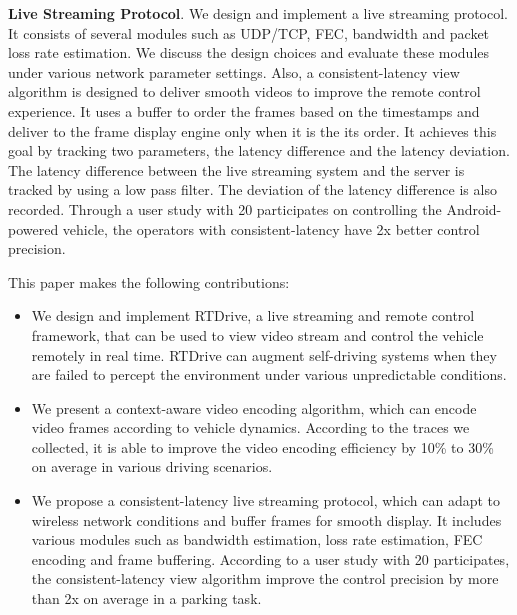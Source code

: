 \textbf{Live Streaming Protocol}.
We design and implement a live streaming protocol. 
It consists of several modules such as UDP/TCP, FEC, 
bandwidth and packet loss rate estimation. 
We discuss the design choices and evaluate these modules
under various network parameter settings. 
Also, a consistent-latency view algorithm 
is designed to deliver smooth
videos to improve the remote control experience. 
It uses a buffer to order the frames based on the timestamps
and deliver to the frame display engine only when it is 
the its order.
It achieves this goal by tracking two parameters, 
the latency difference and the latency deviation.   
The latency difference between
the live streaming system and the server is
tracked by using a low pass filter. 
The deviation of the latency difference is also recorded. 
Through a user study with 20 participates on controlling the Android-powered
vehicle, the operators with consistent-latency have
2x better control precision. 


This paper makes the following contributions:
\begin{itemize}
\setlength\itemsep{0em}

\item We design and implement RTDrive, a live streaming and remote control
framework, that can be used to view video stream and
control the vehicle remotely in real time. 
RTDrive can augment self-driving systems when they are
failed to percept the environment under various unpredictable conditions. 

\item We present a context-aware video encoding algorithm,
which can encode video frames according to vehicle dynamics. 
According to the traces we collected, it is able to improve
the video encoding efficiency by 10\% to 30\% on average in 
various driving scenarios. 

\item We propose a consistent-latency live streaming protocol,
which can adapt to wireless network conditions and buffer frames
for smooth display. 
It includes various modules such as bandwidth estimation, loss rate 
estimation, FEC encoding and frame buffering. 
According to a user study with 20 participates, 
the consistent-latency view algorithm improve the control
precision by more than 2x on average in a parking
task. 
\end{itemize}



